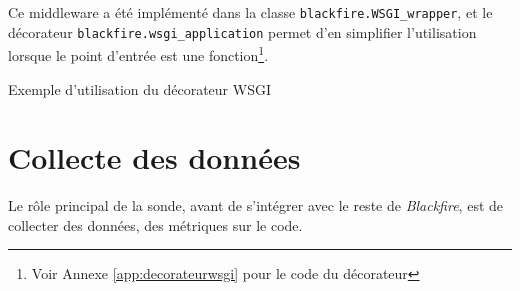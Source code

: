 Ce middleware a été implémenté dans la classe \verb|blackfire.WSGI_wrapper|, et le décorateur \verb|blackfire.wsgi_application| permet d'en simplifier l'utilisation lorsque le point d'entrée est une fonction\footnote{Voir Annexe \vref{app:decorateurwsgi} pour le code du décorateur}.

\begin{listing}[H]
\caption{Exemple d'utilisation du décorateur WSGI}
\end{listing}





  
  \chapter[Collecte]{Collecte des données}
Le rôle principal de la sonde, avant de s'intégrer avec le reste de \emph{Blackfire}, est de collecter des données, des métriques sur le code.

